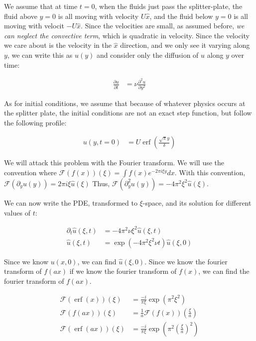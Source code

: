 \documentclass{article}
\DeclareMathOperator\erf{erf}
\begin{document}
We assume that at time $t=0$, when the fluids just pass the splitter-plate,
	the fluid above $y=0$ is all moving with velocity $U \hat{x}$,
	and the fluid below $y=0$ is all moving with velocit $-U \hat{x}$.
Since the velocities are small, as assumed before, \emph{we can neglect the
	convective term}, which is quadratic in velocity.
Since the velocity we care about is the velocity in the $\hat{x}$ direction,
	and we only see it varying along $y$, we can write this as 
	$u(y)$ and consider only the diffusion of $u$ along $y$ over time:

\begin{align}
\frac{\partial u}{\partial t} & = \nu \frac{\partial^2 u}{\partial y^2}
\end{align}

As for initial conditions, we assume that because of whatever physics
	occurs at the splitter plate, the initial conditions are
	not an exact step function, but follow the following 
	profile:

\begin{align}
u(y,t=0) & = U \erf \left( \frac{ \sqrt{\pi} y}{\delta } \right)
\end{align}

We will attack this problem with the Fourier transform.
We will use the convention where $\mathcal{F}(f(x))(\xi) =
	 \int f(x) e^{-2 \pi i \xi y} dx$.
With this convention, $\mathcal{F} \left(\partial_y u(y)\right) 
	= 2\pi i \xi \hat{u}(\xi)$
Thus, $\mathcal{F} \left(\partial_y^2 u(y)\right) 
	= - 4 \pi^2 \xi^2 \hat{u}(\xi)$.

We can now write the PDE, transformed to $\xi$-space, and its solution
	for different values of $t$:

\begin{align}
\partial_t \hat{u}(\xi, t) & = - 4 \pi^2 \nu \xi^2 \hat{u}(\xi, t) \\
\hat{u}(\xi, t) & = \exp \left( - 4 \pi^2 \xi^2 \nu t \right) \hat{u}(\xi, 0)
\end{align}

Since we know $u(x,0)$, we can find $\hat{u}(\xi, 0)$.
Since we know the fourier transform of $f(a x)$ if we know the
	fourier transform of $f(x)$, we can find the fourier
	transform of $f(a x)$. 

\begin{align}
\mathcal{F}(\erf(x))(\xi) & = 
	\frac{-i}{\pi \xi} \exp \left(\pi^2 \xi^2 \right)\\
\mathcal{F}(f(a x))(\xi) & = 
	\frac{1}{a} \mathcal{F}(f(x))\left(\frac{\xi}{a}\right)\\
\mathcal{F}(\erf(a x))(\xi) & =
	\frac{-i}{\pi \xi} \exp \left(\pi^2 
		\left( \frac{\xi}{a} \right)^2 \right)
\end{align}
\end{document}
